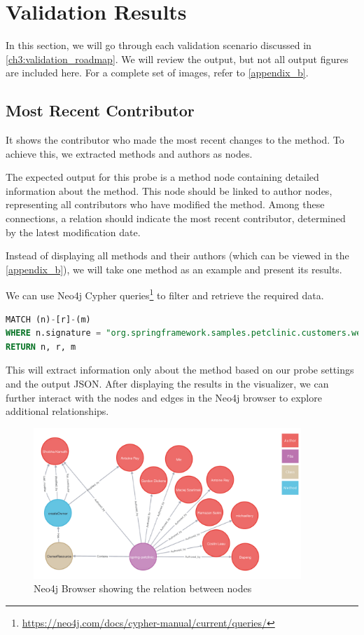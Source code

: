 \section{Validation Results}

In this section, we will go through each validation scenario discussed in \autoref{ch3:validation_roadmap}. We will review the output, but not all output figures are included here. For a complete set of images, refer to \autoref{appendix_b}.

\subsection{Most Recent Contributor}
It shows the contributor who made the most recent changes to the method. To achieve this, we extracted methods and authors as nodes.

The expected output for this probe is a method node containing detailed information about the method. This node should be linked to author nodes, representing all contributors who have modified the method. Among these connections, a relation should indicate the most recent contributor, determined by the latest modification date.

Instead of displaying all methods and their authors (which can be viewed in the \autoref{appendix_b}), we will take one method as an example and present its results.

We can use Neo4j Cypher queries\footnote{\url{https://neo4j.com/docs/cypher-manual/current/queries/}} to filter and retrieve the required data.

\begin{lstlisting}[language=SQL]
MATCH (n)-[r]-(m)
WHERE n.signature = "org.springframework.samples.petclinic.customers.web.OwnerResource.createOwner(org.springframework.samples.petclinic.customers.web.OwnerRequest)"
RETURN n, r, m
\end{lstlisting}

This will extract information only about the method based on our probe settings and the output JSON. After displaying the results in the visualizer, we can further interact with the nodes and edges in the Neo4j browser to explore additional relationships.

\begin{figure}[ht]
    \centering
    \includegraphics[width=0.9\textwidth]{figures/author_file_class_method_relation.png}
    \caption{Neo4j Browser showing the relation between nodes}
    \label{fig:scenerio_1_2_3_overview}
\end{figure}

